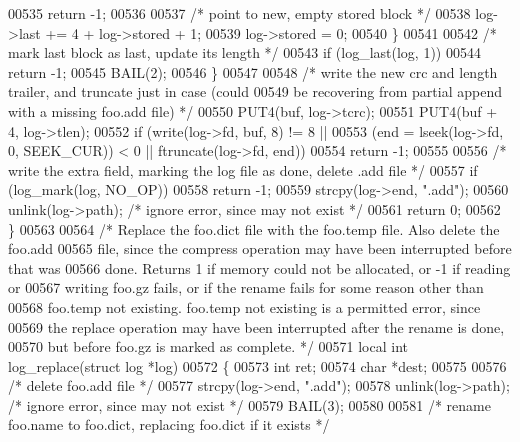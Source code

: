 \begin{DoxyCode}
00535                 \textcolor{keywordflow}{return} -1;
00536 
00537             \textcolor{comment}{/* point to new, empty stored block */}
00538             log->last += 4 + log->stored + 1;
00539             log->stored = 0;
00540         \}
00541 
00542         \textcolor{comment}{/* mark last block as last, update its length */}
00543         \textcolor{keywordflow}{if} (log\_last(log, 1))
00544             \textcolor{keywordflow}{return} -1;
00545         BAIL(2);
00546     \}
00547 
00548     \textcolor{comment}{/* write the new crc and length trailer, and truncate just in case (could}
00549 \textcolor{comment}{       be recovering from partial append with a missing foo.add file) */}
00550     PUT4(buf, log->tcrc);
00551     PUT4(buf + 4, log->tlen);
00552     \textcolor{keywordflow}{if} (write(log->fd, buf, 8) != 8 ||
00553         (end = lseek(log->fd, 0, SEEK\_CUR)) < 0 || ftruncate(log->fd, end))
00554         \textcolor{keywordflow}{return} -1;
00555 
00556     \textcolor{comment}{/* write the extra field, marking the log file as done, delete .add file */}
00557     \textcolor{keywordflow}{if} (log\_mark(log, NO\_OP))
00558         \textcolor{keywordflow}{return} -1;
00559     strcpy(log->end, \textcolor{stringliteral}{".add"});
00560     unlink(log->path);          \textcolor{comment}{/* ignore error, since may not exist */}
00561     \textcolor{keywordflow}{return} 0;
00562 \}
00563 
00564 \textcolor{comment}{/* Replace the foo.dict file with the foo.temp file.  Also delete the foo.add}
00565 \textcolor{comment}{   file, since the compress operation may have been interrupted before that was}
00566 \textcolor{comment}{   done.  Returns 1 if memory could not be allocated, or -1 if reading or}
00567 \textcolor{comment}{   writing foo.gz fails, or if the rename fails for some reason other than}
00568 \textcolor{comment}{   foo.temp not existing.  foo.temp not existing is a permitted error, since}
00569 \textcolor{comment}{   the replace operation may have been interrupted after the rename is done,}
00570 \textcolor{comment}{   but before foo.gz is marked as complete. */}
00571 local \textcolor{keywordtype}{int} log\_replace(\textcolor{keyword}{struct} log *log)
00572 \{
00573     \textcolor{keywordtype}{int} ret;
00574     \textcolor{keywordtype}{char} *dest;
00575 
00576     \textcolor{comment}{/* delete foo.add file */}
00577     strcpy(log->end, \textcolor{stringliteral}{".add"});
00578     unlink(log->path);         \textcolor{comment}{/* ignore error, since may not exist */}
00579     BAIL(3);
00580 
00581     \textcolor{comment}{/* rename foo.name to foo.dict, replacing foo.dict if it exists */}

\end{DoxyCode}
